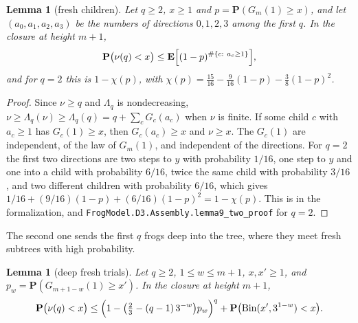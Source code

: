 \documentclass[11pt]{amsart}
\newtheorem{lemma}[theorem]{Lemma}
\theoremstyle{definition}
\numberwithin{equation}{section}
\newcommand{\lean}[1]{\ignorespaces}
\newcommand{\E}{\mathbf{E}}
\renewcommand{\P}{\mathbf{P}}
\newcommand{\Bin}{\operatorname{Bin}}
\begin{document}
\begin{lemma}[fresh children]\label{lem:fresh}\lean{FrogModel.D3.Assembly.lemma9_proof, FrogModel.D3.Iface.lemma9, FrogModel.D3.Assembly.lemma9_two_proof, FrogModel.D3.Iface.lemma9_two, FrogModel.D3.Iface.lemma9Bound, FrogModel.D3.Iface.SPoly}
Let $q\ge2$, $x\ge1$ and $p=\P(G_m(1)\ge x)$, and let $(a_0,a_1,a_2,a_3)$ be the numbers of directions $0,1,2,3$ among the first $q$. In the closure at height $m+1$,
\[
\P\bigl(\nu(q)<x\bigr)\le\E\Bigl[(1-p)^{\#\{c:\ a_c\ge1\}}\Bigr],
\]
and for $q=2$ this is $1-\chi(p)$, with $\chi(p)=\frac{15}{16}-\frac9{16}(1-p)-\frac38(1-p)^2$.
\end{lemma}

\begin{proof}
Since $\nu\ge q$ and $\Lambda_q$ is nondecreasing, $\nu\ge\Lambda_q(\nu)\ge\Lambda_q(q)=q+\sum_cG_c(a_c)$ when $\nu$ is finite. If some child $c$ with $a_c\ge1$ has $G_c(1)\ge x$, then $G_c(a_c)\ge x$ and $\nu\ge x$. The $G_c(1)$ are independent, of the law of $G_m(1)$, and independent of the directions. For $q=2$ the first two directions are two steps to $y$ with probability $1/16$, one step to $y$ and one into a child with probability $6/16$, twice the same child with probability $3/16$, and two different children with probability $6/16$, which gives $1/16+(9/16)(1-p)+(6/16)(1-p)^2=1-\chi(p)$. This is  in the formalization, and \texttt{FrogModel.D3.Assembly.lemma9\_two\_proof} for $q=2$.
\end{proof}

The second one sends the first $q$ frogs deep into the tree, where they meet fresh subtrees with high probability.

\begin{lemma}[deep fresh trials]\label{lem:deep}\lean{FrogModel.D3.LaneA.lemma10_proof, FrogModel.D3.Iface.lemma10}
Let $q\ge2$, $1\le w\le m+1$, $x,x'\ge1$, and $p_w=\P(G_{m+1-w}(1)\ge x')$. In the closure at height $m+1$,
\[
\P\bigl(\nu(q)<x\bigr)\le\Bigl(1-\bigl(\tfrac23-(q-1)\,3^{-w}\bigr)p_w\Bigr)^q+\P\bigl(\Bin(x',3^{1-w})<x\bigr).
\]
\end{lemma}
\end{document}

